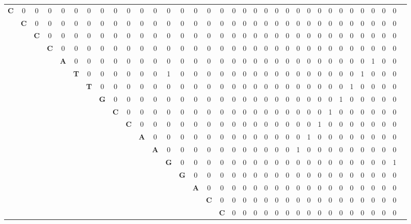 \documentclass[a2paper,landscape]{article}
\begin{document}
        
        \begin{tabular}{ c c c c c c c c c c c c c c c c c c c c c c c c c c c c c c c c c c|} 
 \hline 
\textbf{C} &0 &0 &0 &0 &0 &0 &0 &0 &0 &0 &0 &0 &0 &0 &0 &0 &0 &0 &0 &0 &0 &0 &0 &0 &0 &0 &0 &0 &0 &0 &0 &0 
 \\  
&\textbf{C} &0 &0 &0 &0 &0 &0 &0 &0 &0 &0 &0 &0 &0 &0 &0 &0 &0 &0 &0 &0 &0 &0 &0 &0 &0 &0 &0 &0 &0 &0 &0 
 \\  
&&\textbf{C} &0 &0 &0 &0 &0 &0 &0 &0 &0 &0 &0 &0 &0 &0 &0 &0 &0 &0 &0 &0 &0 &0 &0 &0 &0 &0 &0 &0 &0 &0 
 \\  
&&&\textbf{C} &0 &0 &0 &0 &0 &0 &0 &0 &0 &0 &0 &0 &0 &0 &0 &0 &0 &0 &0 &0 &0 &0 &0 &0 &0 &0 &0 &0 &0 
 \\  
&&&&\textbf{A} &0 &0 &0 &0 &0 &0 &0 &0 &0 &0 &0 &0 &0 &0 &0 &0 &0 &0 &0 &0 &0 &0 &0 &0 &0 &\cellcolor{blue!25} 1 &0 &0 
 \\  
&&&&&\textbf{T} &0 &0 &0 &0 &0 &0 &\cellcolor{blue!25} 1 &0 &0 &0 &0 &0 &0 &0 &0 &0 &0 &0 &0 &0 &0 &0 &0 &\cellcolor{blue!25} 1 &0 &0 &0 
 \\  
&&&&&&\textbf{T} &0 &0 &0 &0 &0 &0 &0 &0 &0 &0 &0 &0 &0 &0 &0 &0 &0 &0 &0 &0 &0 &\cellcolor{blue!25} 1 &0 &0 &0 &0 
 \\  
&&&&&&&\textbf{G} &0 &0 &0 &0 &0 &0 &0 &0 &0 &0 &0 &0 &0 &0 &0 &0 &0 &0 &0 &\cellcolor{blue!25} 1 &0 &0 &0 &0 &0 
 \\  
&&&&&&&&\textbf{C} &0 &0 &0 &0 &0 &0 &0 &0 &0 &0 &0 &0 &0 &0 &0 &0 &0 &\cellcolor{blue!25} 1 &0 &0 &0 &0 &0 &0 
 \\  
&&&&&&&&&\textbf{C} &0 &0 &0 &0 &0 &0 &0 &0 &0 &0 &0 &0 &0 &0 &0 &\cellcolor{blue!25} 1 &0 &0 &0 &0 &0 &0 &0 
 \\  
&&&&&&&&&&\textbf{A} &0 &0 &0 &0 &0 &0 &0 &0 &0 &0 &0 &0 &0 &\cellcolor{blue!25} 1 &0 &0 &0 &0 &0 &0 &0 &0 
 \\  
&&&&&&&&&&&\textbf{A} &0 &0 &0 &0 &0 &0 &0 &0 &0 &0 &0 &\cellcolor{blue!25} 1 &0 &0 &0 &0 &0 &0 &0 &0 &0 
 \\  
&&&&&&&&&&&&\textbf{G} &0 &0 &0 &0 &0 &0 &0 &0 &0 &0 &0 &0 &0 &0 &0 &0 &0 &0 &0 &\cellcolor{blue!25} 1 
 \\  
&&&&&&&&&&&&&\textbf{G} &0 &0 &0 &0 &0 &0 &0 &0 &0 &0 &0 &0 &0 &0 &0 &0 &0 &0 &0 
 \\  
&&&&&&&&&&&&&&\textbf{A} &0 &0 &0 &0 &0 &0 &0 &0 &0 &0 &0 &0 &0 &0 &0 &0 &0 &0 
 \\  
&&&&&&&&&&&&&&&\textbf{C} &0 &0 &0 &0 &0 &0 &0 &0 &0 &0 &0 &0 &0 &0 &0 &0 &0 
 \\  
&&&&&&&&&&&&&&&&\textbf{C} &0 &0 &0 &0 &0 &0 &0 &0 &0 &0 &0 &0 &0 &0 &0 &0 

\end{tabular}
\end{document}

